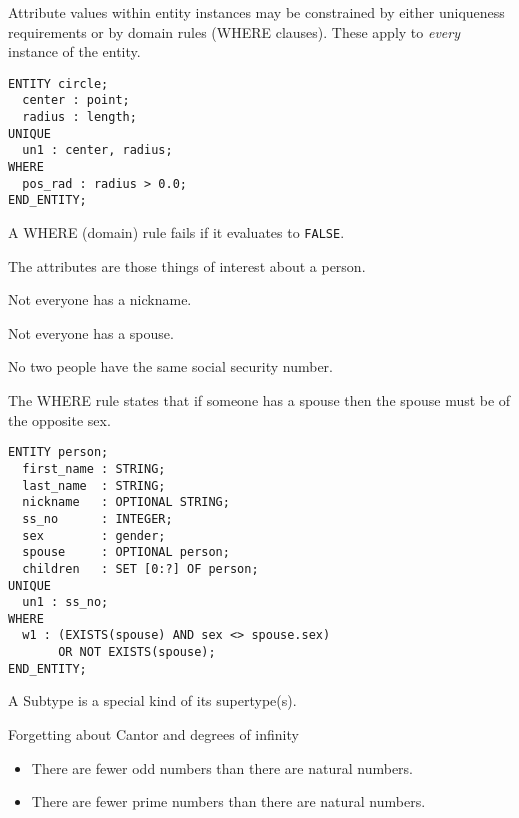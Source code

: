     Attribute values within entity instances may be constrained by either
uniqueness requirements or by domain rules (WHERE clauses). These apply to
\emph{every} instance of the entity.

\begin{verbatim}
ENTITY circle;
  center : point;
  radius : length;
UNIQUE
  un1 : center, radius;
WHERE
  pos_rad : radius > 0.0;
END_ENTITY;
\end{verbatim}

A WHERE (domain) rule fails if it evaluates to \verb|FALSE|.


\begin{remarks}
\remintro
{}

   The attributes are those things of interest about a person. 

Not everyone has a nickname.

Not everyone has a spouse.

No two people have the same social security number.

The WHERE rule states that if someone has a spouse then the spouse must
be of the opposite sex.

\remend
\end{remarks}


\begin{verbatim}
ENTITY person;
  first_name : STRING;
  last_name  : STRING;
  nickname   : OPTIONAL STRING;
  ss_no      : INTEGER;
  sex        : gender;
  spouse     : OPTIONAL person;
  children   : SET [0:?] OF person;
UNIQUE
  un1 : ss_no;
WHERE
  w1 : (EXISTS(spouse) AND sex <> spouse.sex)
       OR NOT EXISTS(spouse);
END_ENTITY;
\end{verbatim}


\begin{remarks}
\remintro
{}

A Subtype is a special kind of its supertype(s). 


Forgetting about Cantor and degrees of infinity
\begin{itemize}
\item    There are fewer odd numbers than there are natural numbers.

\item    There are fewer prime numbers than there are natural numbers.
\end{itemize}

\remend
\end{remarks}

